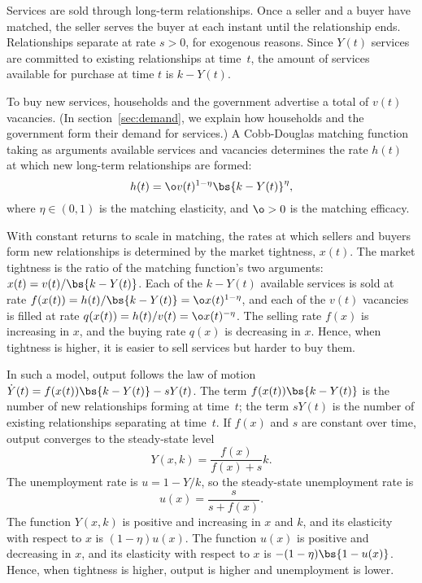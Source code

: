 \documentclass[letterpaper,12pt,leqno]{article}
\begin{document}
\begin{bibunit}
Services are sold through long-term relationships. Once a seller and a buyer have matched, the seller serves the buyer at each instant until the relationship ends. Relationships separate at rate $s>0$, for exogenous reasons. Since $Y(t)$ services are committed to existing relationships at time~$t$, the amount of services available for purchase at time $t$ is $k-Y(t)$.  

To buy new services, households and the government advertise a total of $v(t)$ vacancies. (In section~\ref{sec:demand}, we explain how households and the government form their demand for services.) A Cobb-Douglas matching function taking as arguments available services and vacancies determines the rate $h(t)$ at which new long-term relationships are formed: 
\begin{equation*}
h(t)=\o v(t)^{1-\eta} \bs{k-Y(t)}^{\eta},
\end{equation*} 
where $\eta\in(0,1)$ is the matching elasticity, and $\o>0$ is the matching efficacy.

With constant returns to scale in matching, the rates at which sellers and buyers form new relationships is determined by the market tightness, $x(t)$. The market tightness is the ratio of the matching function's two arguments: $x(t) = v(t)/\bs{k-Y(t)}$.  Each of the $k-Y(t)$ available services is sold at rate $f(x(t)) = h(t)/\bs{k-Y(t)}= \o x(t)^{1-\eta}$, and each of the $v(t)$ vacancies is filled at rate $q(x(t))= h(t)/v(t)= \o  x(t)^{-\eta}$. The selling rate $f(x)$ is increasing in $x$, and the buying rate $q(x)$ is decreasing in $x$. Hence, when tightness is higher, it is easier to sell services but harder to buy them.

In such a model, output follows the law of motion $\dot{Y}(t)=f(x(t))  \bs{k-Y(t)}-s  Y(t)$. The term $f(x(t))  \bs{k-Y(t)}$ is the number of new relationships forming at time~$t$; the term $s Y(t)$ is the number of existing relationships separating at time~$t$. If $f(x)$ and $s$ are constant over time, output converges to the steady-state level 
\begin{equation}
Y(x,k)=\frac{f(x)}{f(x)+s} k.
\label{eq:Yx}\end{equation} 
The unemployment rate is $u=1-Y/k$, so the steady-state unemployment rate is
\begin{equation}
u(x)=\frac{s}{s+f(x)}.
\label{eq:ux}\end{equation}
The function $Y(x,k)$ is positive and increasing in $x$ and $k$, and its elasticity with respect to $x$ is $(1-\eta)  u(x)$. The function $u(x)$ is positive and decreasing in $x$, and its elasticity with respect to $x$ is $-(1-\eta)\bs{1-u(x)}$. Hence, when tightness is higher, output is higher and unemployment is lower.


\end{bibunit}
\end{document}
